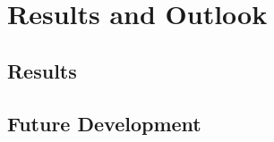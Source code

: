 \chapter{Results and Outlook}\label{results-and-outlook-1}

\section{Results}\label{results}

\section{Future Development}\label{future-development}

\newpage{}